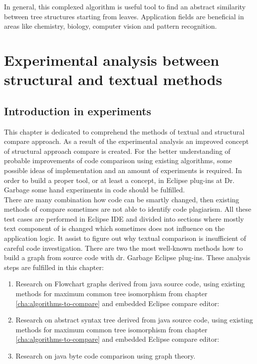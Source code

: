 \documentclass{report}
\begin{document}
In general, this complexed algorithm is useful tool to find an abstract similarity between tree structures starting from leaves. Application fields are beneficial in areas like chemistry, biology, computer vision and pattern recognition. 



\chapter{Experimental analysis between structural and textual methods}
\label{cha:experimental}
\section{Introduction in experiments}

This chapter is dedicated to comprehend the methods of textual and structural compare approach. As a result of the experimental analysis an improved concept of structural approach compare  is created. For the better understanding of probable improvements of code comparison using existing algorithms, some possible ideas of implementation and an amount of experiments is required. In order to build a proper tool, or at least a concept, in Eclipse plug-ins at Dr. Garbage some hand experiments in code should be fulfilled. 
\\
There are many combination how code can be smartly changed, then existing methods of compare sometimes are not able to identify code plagiarism.  All these test cases are performed in Eclipse IDE \cite{eclipse_site} and divided into sections where mostly text component of is changed which sometimes does not influence on the application logic. It assist to figure out why textual comparison is insufficient of careful code investigation. There are two the most well-known methods how to build a graph from source code with dr. Garbage Eclipse plug-ins. These analysis steps are fulfilled in this chapter:
\begin{enumerate}
  \item Research on Flowchart graphs derived from java source code, using existing methods for maximum common tree isomorphism from chapter \ref{cha:algorithms-to-compare} and embedded Eclipse compare editor:	
  
  \item Research on abstract syntax tree derived from java source code, using existing methods for maximum common tree isomorphism from chapter \ref{cha:algorithms-to-compare} and embedded Eclipse compare editor:	
  
  \item Research on java byte code comparison using graph theory.
\end{enumerate}
\end{document}
